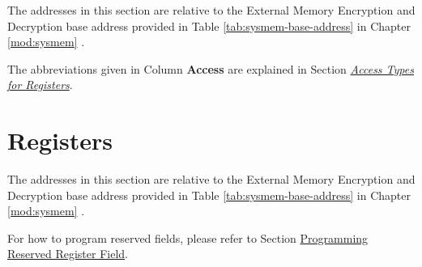 \documentclass[main\_\_EN.tex]{subfiles}
\begin{document}
The addresses in this section are relative to the External Memory Encryption and Decryption base address provided in Table \ref{tab:sysmem-base-address} in Chapter \ref{mod:sysmem} \textit{}.

The abbreviations given in Column \textbf{Access} are explained in Section \hyperref[glossary-access-types]{\textit{Access Types for Registers}}.






\newpage
\section{Registers}

The addresses in this section are relative to the External Memory Encryption and Decryption base address provided in Table \ref{tab:sysmem-base-address} in Chapter \ref{mod:sysmem} \textit{}.

For how to program reserved fields, please refer to Section \hyperref[programming-reserved-field]{Programming Reserved Register Field}.


\end{document}
